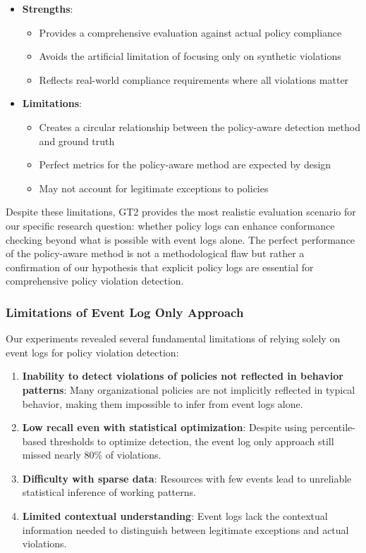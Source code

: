 \begin{itemize}
    \item \textbf{Strengths}:
    \begin{itemize}
        \item Provides a comprehensive evaluation against actual policy compliance
        \item Avoids the artificial limitation of focusing only on synthetic violations
        \item Reflects real-world compliance requirements where all violations matter
    \end{itemize}
    
    \item \textbf{Limitations}:
    \begin{itemize}
        \item Creates a circular relationship between the policy-aware detection method and ground truth
        \item Perfect metrics for the policy-aware method are expected by design
        \item May not account for legitimate exceptions to policies
    \end{itemize}
\end{itemize}

Despite these limitations, GT2 provides the most realistic evaluation scenario for our specific research question: whether policy logs can enhance conformance checking beyond what is possible with event logs alone. The perfect performance of the policy-aware method is not a methodological flaw but rather a confirmation of our hypothesis that explicit policy logs are essential for comprehensive policy violation detection.

\subsubsection{Limitations of Event Log Only Approach}
Our experiments revealed several fundamental limitations of relying solely on event logs for policy violation detection:

\begin{enumerate}
    \item \textbf{Inability to detect violations of policies not reflected in behavior patterns}: Many organizational policies are not implicitly reflected in typical behavior, making them impossible to infer from event logs alone.
    
    \item \textbf{Low recall even with statistical optimization}: Despite using percentile-based thresholds to optimize detection, the event log only approach still missed nearly 80\% of violations.
    
    \item \textbf{Difficulty with sparse data}: Resources with few events lead to unreliable statistical inference of working patterns.
    
    \item \textbf{Limited contextual understanding}: Event logs lack the contextual information needed to distinguish between legitimate exceptions and actual violations.
\end{enumerate}

